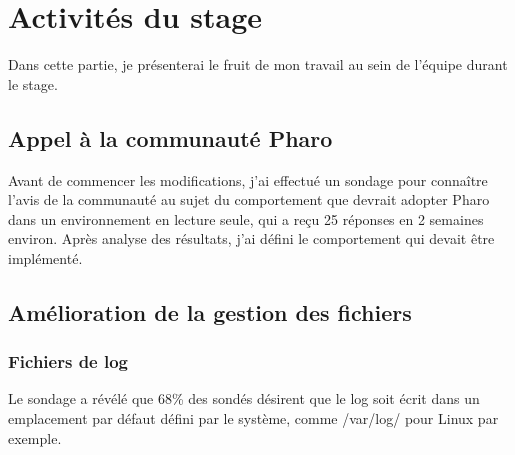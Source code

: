 \section{Activités du stage}
Dans cette partie, je présenterai le fruit de mon travail au sein de l'équipe durant le stage.

\subsection{Appel à la communauté Pharo}
Avant de commencer les modifications, j'ai effectué un sondage pour connaître l'avis de la communauté au sujet du comportement que devrait adopter Pharo dans un environnement en lecture seule, qui a reçu 25 réponses en 2 semaines environ. Après analyse des résultats, j'ai défini le comportement qui devait être implémenté.

\subsection{Amélioration de la gestion des fichiers}

\subsubsection{Fichiers de log}
Le sondage a révélé que 68\% des sondés désirent que le log soit écrit dans un emplacement par défaut défini par le système, comme /var/log/ pour Linux par exemple.